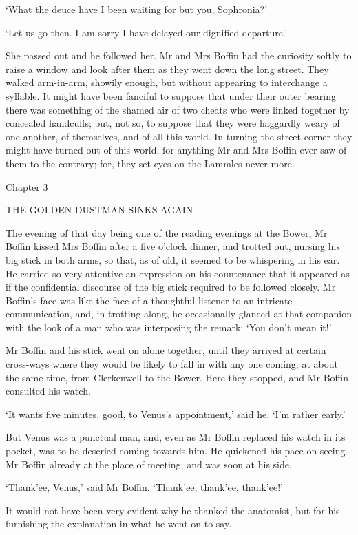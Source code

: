‘What the deuce have I been waiting for but you, Sophronia?’

‘Let us go then. I am sorry I have delayed our dignified departure.’

She passed out and he followed her. Mr and Mrs Boffin had the curiosity
softly to raise a window and look after them as they went down the long
street. They walked arm-in-arm, showily enough, but without appearing
to interchange a syllable. It might have been fanciful to suppose that
under their outer bearing there was something of the shamed air of two
cheats who were linked together by concealed handcuffs; but, not so, to
suppose that they were haggardly weary of one another, of themselves,
and of all this world. In turning the street corner they might have
turned out of this world, for anything Mr and Mrs Boffin ever saw of
them to the contrary; for, they set eyes on the Lammles never more.



Chapter 3

THE GOLDEN DUSTMAN SINKS AGAIN


The evening of that day being one of the reading evenings at the Bower,
Mr Boffin kissed Mrs Boffin after a five o’clock dinner, and trotted
out, nursing his big stick in both arms, so that, as of old, it seemed
to be whispering in his ear. He carried so very attentive an expression
on his countenance that it appeared as if the confidential discourse of
the big stick required to be followed closely. Mr Boffin’s face was like
the face of a thoughtful listener to an intricate communication, and, in
trotting along, he occasionally glanced at that companion with the look
of a man who was interposing the remark: ‘You don’t mean it!’

Mr Boffin and his stick went on alone together, until they arrived at
certain cross-ways where they would be likely to fall in with any one
coming, at about the same time, from Clerkenwell to the Bower. Here they
stopped, and Mr Boffin consulted his watch.

‘It wants five minutes, good, to Venus’s appointment,’ said he. ‘I’m
rather early.’

But Venus was a punctual man, and, even as Mr Boffin replaced his watch
in its pocket, was to be descried coming towards him. He quickened his
pace on seeing Mr Boffin already at the place of meeting, and was soon
at his side.

‘Thank’ee, Venus,’ said Mr Boffin. ‘Thank’ee, thank’ee, thank’ee!’

It would not have been very evident why he thanked the anatomist, but
for his furnishing the explanation in what he went on to say.

